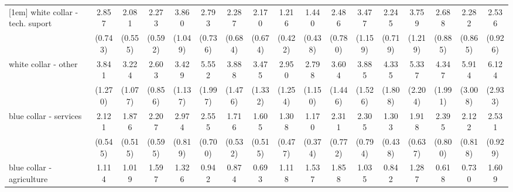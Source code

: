 {\begin{tabular}{l*{16}{c}}
[1em]
white collar - tech. suport&       2.857\sym{***}&       2.081\sym{**} &       2.273\sym{**} &       3.860\sym{***}&       2.793\sym{***}&       2.287\sym{**} &       2.170\sym{*}  &       1.216         &       1.440         &       2.486\sym{**} &       3.477\sym{***}&       2.245\sym{*}  &       3.759\sym{***}&       2.688\sym{**} &       2.282\sym{*}  &       2.536\sym{*}  \\
                    &     (0.743)         &     (0.555)         &     (0.592)         &     (1.049)         &     (0.736)         &     (0.684)         &     (0.674)         &     (0.422)         &     (0.438)         &     (0.780)         &     (1.159)         &     (0.719)         &     (1.219)         &     (0.885)         &     (0.865)         &     (0.926)         \\
[1em]
white collar - other&       3.841\sym{***}&       3.224\sym{***}&       2.603\sym{**} &       3.429\sym{***}&       5.552\sym{***}&       3.888\sym{***}&       3.475\sym{**} &       2.950\sym{*}  &       2.798\sym{*}  &       3.604\sym{**} &       3.885\sym{***}&       4.335\sym{***}&       5.337\sym{***}&       4.347\sym{**} &       5.914\sym{***}&       6.124\sym{***}\\
                    &     (1.270)         &     (1.077)         &     (0.856)         &     (1.137)         &     (1.997)         &     (1.476)         &     (1.332)         &     (1.254)         &     (1.150)         &     (1.446)         &     (1.526)         &     (1.808)         &     (2.204)         &     (1.991)         &     (3.008)         &     (2.933)         \\
[1em]
blue collar - services&       2.121\sym{**} &       1.876\sym{*}  &       2.207\sym{**} &       2.974\sym{***}&       2.555\sym{***}&       1.716         &       1.605         &       1.308         &       1.170         &       2.311\sym{*}  &       2.305\sym{*}  &       1.303         &       1.918\sym{*}  &       2.395\sym{**} &       2.122         &       2.531\sym{*}  \\
                    &     (0.545)         &     (0.515)         &     (0.595)         &     (0.819)         &     (0.700)         &     (0.532)         &     (0.515)         &     (0.477)         &     (0.374)         &     (0.772)         &     (0.794)         &     (0.438)         &     (0.637)         &     (0.800)         &     (0.818)         &     (0.929)         \\
[1em]
blue collar - agriculture&       1.114         &       1.019         &       1.597         &       1.326         &       0.942         &       0.874         &       0.693         &       1.118         &       1.537         &       1.858         &       1.035         &       0.842         &       1.287         &       0.618         &       0.730         &       1.609         \\

\end{tabular}}
